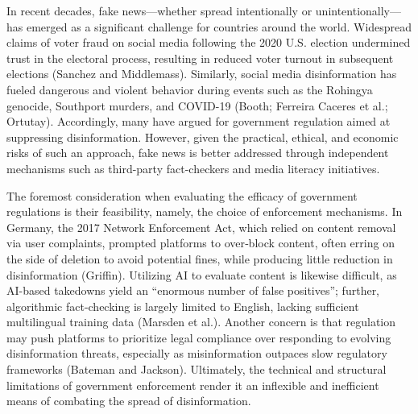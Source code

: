 \documentclass[12pt, a4paper, twoside]{article}
\begin{document}
\maketitle{}

In recent decades, fake news—whether spread intentionally or unintentionally—has emerged as a significant challenge for countries around the world. Widespread claims of voter fraud on social media following the 2020 U.S. election undermined trust in the electoral process, resulting in reduced voter turnout in subsequent elections (Sanchez and Middlemass). Similarly, social media disinformation has fueled dangerous and violent behavior during events such as the Rohingya genocide, Southport murders, and COVID-19 (Booth; Ferreira Caceres et al.; Ortutay). Accordingly, many have argued for government regulation aimed at suppressing disinformation. However, given the practical, ethical, and economic risks of such an approach, fake news is better addressed through independent mechanisms such as third-party fact-checkers and media literacy initiatives. 

The foremost consideration when evaluating the efficacy of government regulations is their feasibility, namely, the choice of enforcement mechanisms. In Germany, the 2017 Network Enforcement Act, which relied on content removal via user complaints, prompted platforms to over‐block content, often erring on the side of deletion to avoid potential fines, while producing little reduction in disinformation (Griffin). Utilizing AI to evaluate content is likewise difficult, as AI-based takedowns yield an “enormous number of false positives”; further, algorithmic fact-checking is largely limited to English, lacking sufficient multilingual training data (Marsden et al.). Another concern is that regulation may push platforms to prioritize legal compliance over responding to evolving disinformation threats, especially as misinformation outpaces slow regulatory frameworks (Bateman and Jackson). Ultimately, the technical and structural limitations of government enforcement render it an inflexible and inefficient means of combating the spread of disinformation. 
\end{document}

